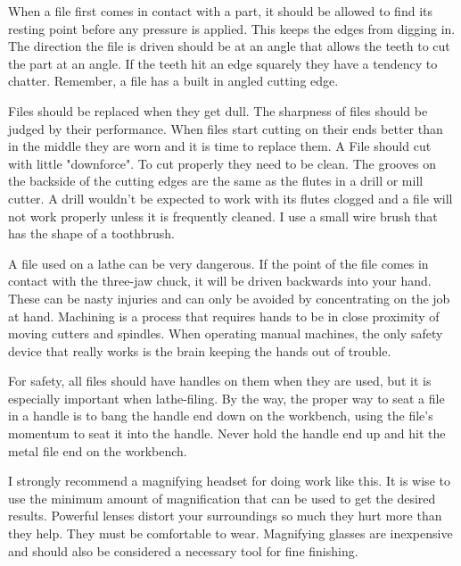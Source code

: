 When a file first comes in contact with a part, it should be allowed to find its
resting point before any pressure is applied. This keeps the edges from digging
in. The direction the file is driven should be at an angle that allows the teeth
to cut the part at an angle. If the teeth hit an edge squarely they have a
tendency to chatter. Remember, a file has a built in angled cutting edge.


Files should be replaced when they get dull. The sharpness of files should be
judged by their performance. When files start cutting on their ends better than
in the middle they are worn and it is time to replace them. A File should cut
with little "downforce". To cut properly they need to be clean. The grooves on
the backside of the cutting edges are the same as the flutes in a drill or mill
cutter. A drill wouldn't be expected to work with its flutes clogged and a file
will not work properly unless it is frequently cleaned. I use a small wire brush
that has the shape of a toothbrush.


A file used on a lathe can be very dangerous. If the point of the file comes in
contact with the three-jaw chuck, it will be driven backwards into your hand.
These can be nasty injuries and can only be avoided by concentrating on the job
at hand. Machining is a process that requires hands to be in close proximity of
moving cutters and spindles. When operating manual machines, the only safety
device that really works is the brain keeping the hands out of trouble.


For safety, all files should have handles on them when they are used, but it is
especially important when lathe-filing. By the way, the proper way to seat a
file in a handle is to bang the handle end down on the workbench, using the
file's momentum to seat it into the handle. Never hold the handle end up and hit
the metal file end on the workbench.


I strongly recommend a magnifying headset for doing work like this. It is wise
to use the minimum amount of magnification that can be used to get the desired
results. Powerful lenses distort your surroundings so much they hurt more than
they help. They must be comfortable to wear. Magnifying glasses are inexpensive
and should also be considered a necessary tool for fine finishing.

